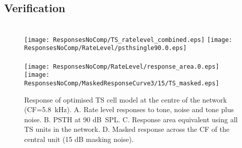 \subsection{Verification}


\begin{figure}[htb]
\centering
\hspace{0.5cm}\hspace{0.5\textwidth}\hfill\\
\texttt{[image: ResponsesNoComp/TS\_ratelevel\_combined.eps]}\hfill%
\texttt{[image: ResponsesNoComp/RateLevel/psthsingle90.0.eps]}\\
\hspace{0.5cm}\hspace{0.5\textwidth}\hfill\\
\texttt{[image: ResponsesNoComp/RateLevel/response\_area.0.eps]}\hfill%
\texttt{[image: ResponsesNoComp/MaskedResponseCurve3/15/TS\_masked.eps]}\\
\caption[Optimised TS cell model responses]{Response of optimised TS cell model at the centre of the network (CF=5.8~kHz). A. Rate level responses to tone, noise and tone plus noise. 
B. PSTH at 90 dB~SPL.  
C. Response area equivalent using all TS units in the network. 
D. Masked response across the CF of the central unit (15 dB masking noise).} \label{fig:TS_verification}
\end{figure}






